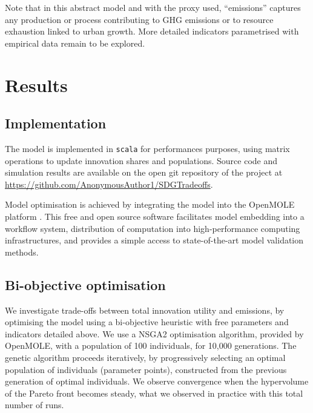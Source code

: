 \documentclass[final,5p,times,twocolumn,authoryear]{elsarticle}
\begin{document}
Note that in this abstract model and with the proxy used, ``emissions'' captures any production or process contributing to GHG emissions or to resource exhaustion linked to urban growth. More detailed indicators parametrised with empirical data remain to be explored.



\section{Results}

\subsection{Implementation}

The model is implemented in \texttt{scala} for performances purposes, using matrix operations to update innovation shares and populations. Source code and simulation results are available on the open git repository of the project at \url{https://github.com/AnonymousAuthor1/SDGTradeoffs}.

Model optimisation is achieved by integrating the model into the OpenMOLE platform \cite{reuillon2013openmole}. This free and open source software facilitates model embedding into a workflow system, distribution of computation into high-performance computing infrastructures, and provides a simple access to state-of-the-art model validation methods.


\subsection{Bi-objective optimisation}

We investigate trade-offs between total innovation utility and emissions, by optimising the model using a bi-objective heuristic with free parameters and indicators detailed above. We use a NSGA2 optimisation algorithm, provided by OpenMOLE, with a population of 100 individuals, for 10,000 generations. The genetic algorithm proceeds iteratively, by progressively selecting an optimal population of individuals (parameter points), constructed from the previous generation of optimal individuals. We observe convergence when the hypervolume of the Pareto front becomes steady, what we observed in practice with this total number of runs.
\end{document}

